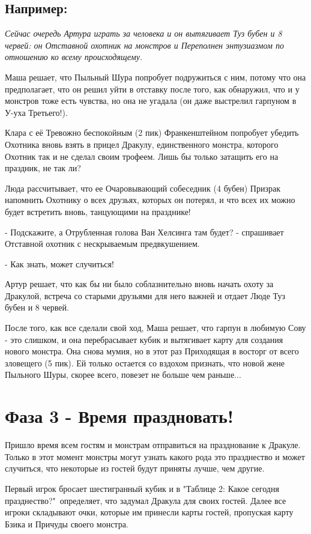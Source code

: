 \documentclass[twoside,twocolumn]{article}
\begin{document}
\subsection*{Например:}
{\itshape 
Сейчас очередь Артура играть за человека и он вытягивает Туз бубен и 8 червей: он Отставной охотник на монстров и Переполнен энтузиазмом по отношению ко всему происходящему.

Маша решает, что Пыльный Шура попробует подружиться с ним, потому что она предполагает, что он решил уйти в отставку после того, как обнаружил, что и у монстров тоже есть чувства, но она не угадала (он даже выстрелил гарпуном в У-уха Третьего!). 

Клара с её Тревожно беспокойным (2 пик) Франкенштейном попробует убедить Охотника вновь взять в прицел Дракулу, единственного монстра, которого Охотник так и не сделал своим трофеем. Лишь бы только затащить его на праздник, не так ли?

Люда рассчитывает, что ее Очаровывающий собеседник (4 бубен) Призрак напомнить Охотнику о всех друзьях, которых он потерял, и что всех их можно будет встретить вновь, танцующими на празднике!

- Подскажите, а Отрубленная голова Ван Хелсинга там будет? - спрашивает Отставной охотник с нескрываемым предвкушением.

- Как знать, может случиться!

Артур решает, что как бы ни было соблазнительно вновь начать охоту за Дракулой, встреча со старыми друзьями для него важней и отдает Люде Туз бубен и 8 червей.

После того, как все сделали свой ход, Маша решает, что гарпун в любимую Сову - это слишком, и она перебрасывает кубик и вытягивает карту для создания нового монстра. Она снова мумия, но в этот раз Приходящая в восторг от всего зловещего (5 пик). Ей только остается со вздохом признать, что новой жене Пыльного Шуры, скорее всего, повезет не больше чем раньше...
}

\section*{Фаза 3 - Время праздновать!}
Пришло время всем гостям и монстрам отправиться на празднование к Дракуле. Только в этот момент монстры могут узнать какого рода это празднество и может случиться, что некоторые из гостей будут приняты лучше, чем другие.

Первый игрок бросает шестигранный кубик и в "Таблице 2: Какое сегодня празднество?"\ определяет, что задумал Дракула для своих гостей. Далее все игроки складывают очки, которые им принесли карты гостей, пропуская карту Бзика и Причуды своего монстра.
\end{document}
